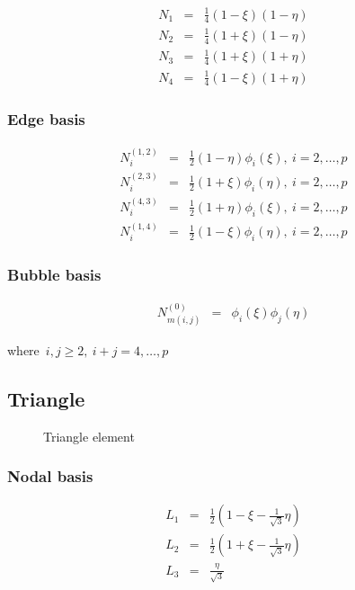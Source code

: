 \begin{eqnarray*}
N_1&=&\frac{1}{4}(1-\xi)(1-\eta) \\
N_2&=&\frac{1}{4}(1+\xi)(1-\eta) \\
N_3&=&\frac{1}{4}(1+\xi)(1+\eta) \\
N_4&=&\frac{1}{4}(1-\xi)(1+\eta)
\end{eqnarray*}

\subsubsection{Edge basis}

\begin{eqnarray*}
N_i^{(1,2)}&=&\frac{1}{2}(1-\eta)\phi_i(\xi), \ i=2,\ldots,p \\
N_i^{(2,3)}&=&\frac{1}{2}(1+\xi)\phi_i(\eta), \ i=2,\ldots,p \\
N_i^{(4,3)}&=&\frac{1}{2}(1+\eta)\phi_i(\xi), \ i=2,\ldots,p \\ 
N_i^{(1,4)}&=&\frac{1}{2}(1-\xi)\phi_i(\eta), \ i=2,\ldots,p
\end{eqnarray*} 

\subsubsection{Bubble basis}

\begin{eqnarray*}
N_{m(i,j)}^{(0)}&=&\phi_i(\xi)\phi_j(\eta)
\end{eqnarray*}

\noindent where\ $i,j\geq 2,\ i+j=4,\ldots,p$

\subsection{Triangle}

\begin{figure}[tbhp]
\begin{center}

\caption{Triangle element}
\end{center}
\end{figure}

\subsubsection{Nodal basis}

\begin{eqnarray*}
L_1&=&\frac{1}{2}(1-\xi-\frac{1}{\sqrt{3}}\eta) \\
L_2&=&\frac{1}{2}(1+\xi-\frac{1}{\sqrt{3}}\eta) \\
L_3&=&\frac{\eta}{\sqrt{3}}
\end{eqnarray*}

